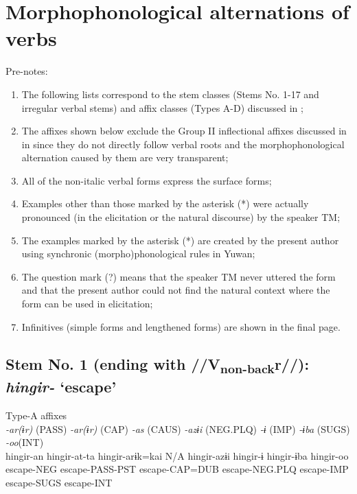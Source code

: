 \chapter{Morphophonological alternations of verbs}

Pre-notes:

\begin{enumerate}[label=(\alph*.)]
\item The following lists correspond to the stem classes (Stems No. 1-17 and irregular verbal stems) and affix classes (Types A-D) discussed in ;
\item The affixes shown below exclude the Group II inflectional affixes discussed in  in  since they do not directly follow verbal roots and the morphophonological alternation caused by them are very transparent;
\item All of the non-italic verbal forms express the surface forms;
\item Examples other than those marked by the asterisk (*) were actually pronounced (in the elicitation or the natural discourse) by the speaker TM;
\item The examples marked by the asterisk (*) are created by the present author using synchronic (morpho)phonological rules in Yuwan;
\item The question mark (?) means that the speaker TM never uttered the form and that the present author could not find the natural context where the form can be used in elicitation;
\item Infinitives (simple forms and lengthened forms) are shown in the final page.
\end{enumerate}

\section{Stem No. 1 (ending with //V\textsubscript{non-back}r//): \textit{hingir-} ‘escape’}

\ea Type-A affixes\\
  {\textit{-ar(ɨr)} (PASS) } {\textit{-ar(ɨr)} (CAP)}  {\textit{-as} (CAUS)}  {\textit{-azɨi} (NEG.PLQ)}  {\textit{-ɨ} (IMP)}  {\textit{-ɨba} (SUGS)}  {\textit{-oo}(INT)}\\
hingir-an  hingir-at-ta  hingir-arɨk=kai  {N/A\footnotemark}  hingir-azɨi  hingir-ɨ  hingir-ɨba  hingir-oo\\
escape-NEG  escape-PASS-PST  escape-CAP=DUB    escape-NEG.PLQ  escape-IMP  escape-SUGS  escape-INT\\
\z{}

